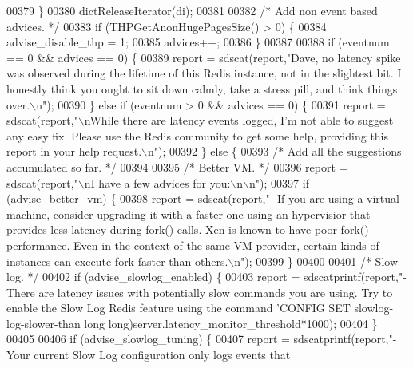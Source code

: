 \begin{DoxyCode}
{{00379     \}
00380     dictReleaseIterator(di);
00381 
00382     \textcolor{comment}{/* Add non event based advices. */}
00383     \textcolor{keywordflow}{if} (THPGetAnonHugePagesSize() > 0) \{
00384         advise\_disable\_thp = 1;
00385         advices++;
00386     \}
00387 
00388     \textcolor{keywordflow}{if} (eventnum == 0 && advices == 0) \{
00389         report = sdscat(report,\textcolor{stringliteral}{"Dave, no latency spike was observed during the lifetime of this Redis
       instance, not in the slightest bit. I honestly think you ought to sit down calmly, take a stress pill, and
       think things over.\(\backslash\)n"});
00390     \} \textcolor{keywordflow}{else} \textcolor{keywordflow}{if} (eventnum > 0 && advices == 0) \{
00391         report = sdscat(report,\textcolor{stringliteral}{"\(\backslash\)nWhile there are latency events logged, I'm not able to suggest any
       easy fix. Please use the Redis community to get some help, providing this report in your help request.\(\backslash\)n"});
00392     \} \textcolor{keywordflow}{else} \{
00393         \textcolor{comment}{/* Add all the suggestions accumulated so far. */}
00394 
00395         \textcolor{comment}{/* Better VM. */}
00396         report = sdscat(report,\textcolor{stringliteral}{"\(\backslash\)nI have a few advices for you:\(\backslash\)n\(\backslash\)n"});
00397         \textcolor{keywordflow}{if} (advise\_better\_vm) \{
00398             report = sdscat(report,\textcolor{stringliteral}{"- If you are using a virtual machine, consider upgrading it with a
       faster one using an hypervisior that provides less latency during fork() calls. Xen is known to have poor
       fork() performance. Even in the context of the same VM provider, certain kinds of instances can execute fork
       faster than others.\(\backslash\)n"});
00399         \}
00400 
00401         \textcolor{comment}{/* Slow log. */}
00402         \textcolor{keywordflow}{if} (advise\_slowlog\_enabled) \{
00403             report = sdscatprintf(report,\textcolor{stringliteral}{"- There are latency issues with potentially slow commands
       you are using. Try to enable the Slow Log Redis feature using the command 'CONFIG SET slowlog-log-slower-than
      long} \textcolor{keywordtype}{long})server.latency\_monitor\_threshold*1000);
00404         \}
00405 
00406         \textcolor{keywordflow}{if} (advise\_slowlog\_tuning) \{
00407             report = sdscatprintf(report,\textcolor{stringliteral}{"- Your current Slow Log configuration only logs events that
}}}
\end{DoxyCode}
